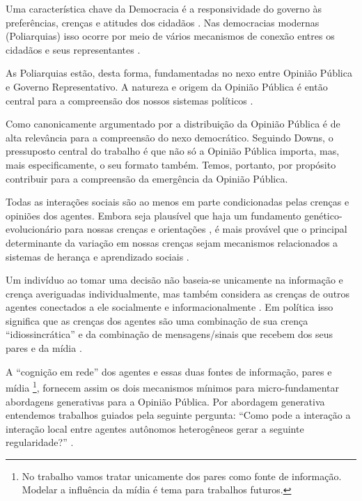 Uma característica chave da Democracia é a responsividade do governo às
preferências, crenças e atitudes dos cidadãos
\cite{dahl1973polyarchy,bartels2003democracy}. Nas democracias modernas
(Poliarquias) isso ocorre por meio de vários mecanismos de conexão entres os
cidadãos e seus representantes \cite{dahl1989democracy,
  schumpeter2013capitalism}.

As Poliarquias estão, desta forma, fundamentadas no nexo entre Opinião Pública e
Governo Representativo. A natureza e origem da Opinião Pública é então
central para a compreensão dos nossos sistemas políticos
\cite{berelson1952democratic}.

Como canonicamente argumentado por  a distribuição
da Opinião Pública é de alta relevância para a compreensão do nexo democrático.
Seguindo Downs, o pressuposto central do trabalho é que não só a Opinião Pública
importa, mas, mais especificamente, o seu formato também. Temos, portanto, por
propósito contribuir para a compreensão da emergência da Opinião
Pública.

Todas as interações sociais são ao menos em parte condicionadas pelas crenças e
opiniões dos agentes. Embora seja plausível que haja um fundamento
genético-evolucionário para nossas crenças e orientações
\cite{fowler2008biology, fowler2013defense}, é mais provável que o principal
determinante da variação em  nossas crenças sejam  mecanismos relacionados a 
sistemas de herança e aprendizado sociais \cite{jablonka2014evolution}.

Um indivíduo ao tomar uma decisão não baseia-se unicamente na informação e
crença averiguadas individualmente, mas também considera as crenças de outros
agentes conectados a ele socialmente e informacionalmente
\cite{gintis2016individuality}. Em política isso significa que as crenças dos
agentes são uma combinação de sua crença ``idiossincrática'' e da combinação de
mensagens/sinais que recebem dos seus pares e da mídia
\cite{barabas2004deliberation,ryan2011social}.

A ``cognição em rede'' \cite{gintis2016individuality} dos agentes e essas duas
fontes de informação, pares e mídia \footnote{No trabalho vamos tratar
  unicamente dos pares como fonte de informação. Modelar a influência da mídia é
  tema para trabalhos futuros.}, fornecem assim os dois mecanismos mínimos para
micro-fundamentar abordagens generativas para a Opinião Pública. Por abordagem
generativa entendemos trabalhos guiados pela seguinte pergunta: ``Como pode a
interação a interação local entre agentes autônomos heterogêneos gerar a
seguinte regularidade?'' \cite{epstein2006generative}.

